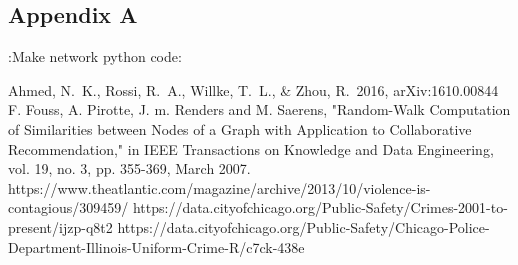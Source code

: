 \documentclass{article}
\begin{document}
\begin{appendices}
 \chapter{Appendix A}
 \label{appendix:a}
 :Make network python code: 
 
\end{appendices}

\begin{thebibliography}{9}

 Ahmed, N.~K., Rossi, R.~A., Willke, T.~L., \& Zhou, R.\ 2016, arXiv:1610.00844 
 F. Fouss, A. Pirotte, J. m. Renders and M. Saerens, "Random-Walk Computation of Similarities between Nodes of a Graph with Application to Collaborative Recommendation," in IEEE Transactions on Knowledge and Data Engineering, vol. 19, no. 3, pp. 355-369, March 2007.
https://www.theatlantic.com/magazine/archive/2013/10/violence-is-contagious/309459/
https://data.cityofchicago.org/Public-Safety/Crimes-2001-to-present/ijzp-q8t2
https://data.cityofchicago.org/Public-Safety/Chicago-Police-Department-Illinois-Uniform-Crime-R/c7ck-438e
\end{thebibliography}
\end{document}
